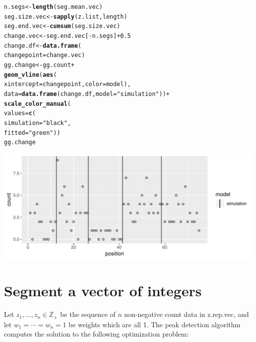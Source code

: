 \documentclass[12pt]{article}\usepackage[]{graphicx}\usepackage[]{color}
\makeatletter
\def\maxwidth{ %
  \ifdim\Gin@nat@width>\linewidth
    \linewidth
  \else
    \Gin@nat@width
  \fi
}
\newcommand{\hlnum}[1]{\textcolor[rgb]{0.686,0.059,0.569}{#1}}%
\newcommand{\hlstr}[1]{\textcolor[rgb]{0.192,0.494,0.8}{#1}}%
\newcommand{\hlopt}[1]{\textcolor[rgb]{0,0,0}{#1}}%
\newcommand{\hlstd}[1]{\textcolor[rgb]{0.345,0.345,0.345}{#1}}%
\newcommand{\hlkwb}[1]{\textcolor[rgb]{0.69,0.353,0.396}{#1}}%
\newcommand{\hlkwc}[1]{\textcolor[rgb]{0.333,0.667,0.333}{#1}}%
\newcommand{\hlkwd}[1]{\textcolor[rgb]{0.737,0.353,0.396}{\textbf{#1}}}%
\newenvironment{kframe}{%
 \def\at@end@of@kframe{}%
 \ifinner\ifhmode%
  \def\at@end@of@kframe{\end{minipage}}%
  \begin{minipage}{\columnwidth}%
 \fi\fi%
 \def\FrameCommand##1{\hskip\@totalleftmargin \hskip-\fboxsep
 \colorbox{shadecolor}{##1}\hskip-\fboxsep
     \hskip-\linewidth \hskip-\@totalleftmargin \hskip\columnwidth}%
 \MakeFramed {\advance\hsize-\width
   \@totalleftmargin\z@ \linewidth\hsize
   \@setminipage}}%
 {\par\unskip\endMakeFramed%
 \at@end@of@kframe}
\newenvironment{knitrout}{}{} %
\makeatother
\begin{document}
\begin{knitrout}
\color{fgcolor}\begin{kframe}
\begin{alltt}
\hlstd{n.segs} \hlkwb{<-} \hlkwd{length}\hlstd{(seg.mean.vec)}
\hlstd{seg.size.vec} \hlkwb{<-} \hlkwd{sapply}\hlstd{(z.list, length)}
\hlstd{seg.end.vec} \hlkwb{<-} \hlkwd{cumsum}\hlstd{(seg.size.vec)}
\hlstd{change.vec} \hlkwb{<-} \hlstd{seg.end.vec[}\hlopt{-}\hlstd{n.segs]}\hlopt{+}\hlnum{0.5}
\hlstd{change.df} \hlkwb{<-} \hlkwd{data.frame}\hlstd{(}
  \hlkwc{changepoint}\hlstd{=change.vec)}
\hlstd{gg.change} \hlkwb{<-} \hlstd{gg.count}\hlopt{+}
  \hlkwd{geom_vline}\hlstd{(}\hlkwd{aes}\hlstd{(}
    \hlkwc{xintercept}\hlstd{=changepoint,} \hlkwc{color}\hlstd{=model),}
    \hlkwc{data}\hlstd{=}\hlkwd{data.frame}\hlstd{(change.df,} \hlkwc{model}\hlstd{=}\hlstr{"simulation"}\hlstd{))}\hlopt{+}
  \hlkwd{scale_color_manual}\hlstd{(}
    \hlkwc{values}\hlstd{=}\hlkwd{c}\hlstd{(}
      \hlkwc{simulation}\hlstd{=}\hlstr{"black"}\hlstd{,}
      \hlkwc{fitted}\hlstd{=}\hlstr{"green"}\hlstd{))}
\hlstd{gg.change}
\end{alltt}
\end{kframe}

{\centering \includegraphics[width=\maxwidth]{figure/unnamed-chunk-2-1} 

}



\end{knitrout}

\section{Segment a vector of integers}

Let $z_1, \dots, z_n\in\mathbb Z_+$ be the sequence of $n$
non-negative count data in z.rep.vec, and let $w_1=\cdots=w_n=1$ be
weights which are all 1. The peak detection algorithm computes the
solution to the following optimization problem:
\end{document}
